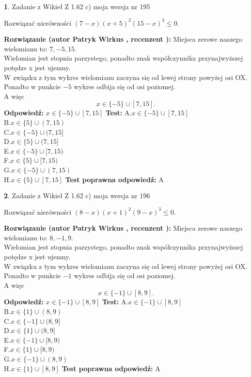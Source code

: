 \documentclass[12pt, a4paper]{article}
\theoremstyle{definition} %
\newtheorem{zad}{}
\newcommand{\zadStart}[1]{\begin{zad}#1\newline}
\newcommand{\zadStop}{\end{zad}}
\newcommand{\rozwStart}[2]{\noindent \textbf{Rozwiązanie (autor #1 , recenzent #2): }\newline}
\newcommand{\rozwStop}{\newline}
\newcommand{\odpStart}{\noindent \textbf{Odpowiedź:}\newline}
\newcommand{\odpStop}{\newline}
\newcommand{\testStart}{\noindent \textbf{Test:}\newline}
\newcommand{\testStop}{\newline}
\newcommand{\kluczStart}{\noindent \textbf{Test poprawna odpowiedź:}\newline}
\newcommand{\kluczStop}{\newline}
\begin{document}
\zadStart{Zadanie z Wikieł Z 1.62 c) moja wersja nr 195}

Rozwiązać nierówności $(7-x)(x+5)^{2}(15-x)^{3}\le0$.
\zadStop
\rozwStart{Patryk Wirkus}{}
Miejsca zerowe naszego wielomianu to: $7, -5, 15$.\\
Wielomian jest stopnia parzystego, ponadto znak współczynnika przy\linebreak najwyższej potędze x jest ujemny.\\ W związku z tym wykres wielomianu zaczyna się od lewej strony powyżej osi OX.\\
Ponadto w punkcie $-5$ wykres odbija się od osi poziomej.\\
A więc $$x \in \{-5\} \cup [7,15].$$
\rozwStop
\odpStart
$x \in \{-5\} \cup [7,15]$
\odpStop
\testStart
A.$x \in \{-5\} \cup [7,15]$\\
B.$x \in \{5\} \cup (7,15)$\\
C.$x \in \{-5\} \cup (7,15]$\\
D.$x \in \{5\} \cup (7,15]$\\
E.$x \in \{-5\} \cup [7,15)$\\
F.$x \in \{5\} \cup [7,15)$\\
G.$x \in \{-5\} \cup (7,15)$\\
H.$x \in \{5\} \cup [7,15]$
\testStop
\kluczStart
A
\kluczStop



\zadStart{Zadanie z Wikieł Z 1.62 c) moja wersja nr 196}

Rozwiązać nierówności $(8-x)(x+1)^{2}(9-x)^{3}\le0$.
\zadStop
\rozwStart{Patryk Wirkus}{}
Miejsca zerowe naszego wielomianu to: $8, -1, 9$.\\
Wielomian jest stopnia parzystego, ponadto znak współczynnika przy\linebreak najwyższej potędze x jest ujemny.\\ W związku z tym wykres wielomianu zaczyna się od lewej strony powyżej osi OX.\\
Ponadto w punkcie $-1$ wykres odbija się od osi poziomej.\\
A więc $$x \in \{-1\} \cup [8,9].$$
\rozwStop
\odpStart
$x \in \{-1\} \cup [8,9]$
\odpStop
\testStart
A.$x \in \{-1\} \cup [8,9]$\\
B.$x \in \{1\} \cup (8,9)$\\
C.$x \in \{-1\} \cup (8,9]$\\
D.$x \in \{1\} \cup (8,9]$\\
E.$x \in \{-1\} \cup [8,9)$\\
F.$x \in \{1\} \cup [8,9)$\\
G.$x \in \{-1\} \cup (8,9)$\\
H.$x \in \{1\} \cup [8,9]$
\testStop
\kluczStart
A
\kluczStop
\end{document}
